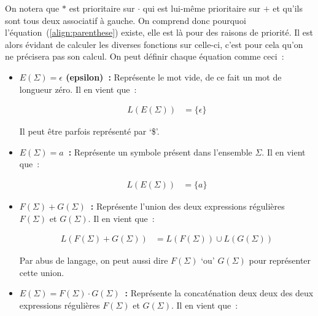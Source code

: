\documentclass[12pt]{article}
\begin{document}
On notera que \(*\) est prioritaire sur \(\cdot\) qui est lui-même prioritaire
sur \(+\) et qu'ils sont tous deux associatif à gauche. On comprend donc
pourquoi l'équation~(\ref{align:parenthese}) existe, elle est là pour des
raisons de priorité. Il est alors évidant de calculer les diverses fonctions
sur celle-ci, c'est pour cela qu'on ne précisera pas son
calcul\label{text:parenthese}. On peut définir chaque équation comme ceci~:

\vphantom{}

\begin{itemize}
    \item[\textbullet] \textbf{\(E(\Sigma) = \epsilon\) (epsilon)~:}
        Représente le mot vide, de ce fait un mot de longueur zéro. Il en vient
        que~:

        \begin{align}
            L(E(\Sigma)) & = \{\epsilon\}
        \end{align}

        Il peut être parfois représenté par `\$'.

        \vphantom{}

    \item[\textbullet] \textbf{\(E(\Sigma) = a\)~:} Représente un symbole
        présent dans l'ensemble \(\Sigma\). Il en vient que~:

        \begin{align}
            L(E(\Sigma)) & = \{a\}
        \end{align}

        \vphantom{}

    \item[\textbullet] \textbf{\(F(\Sigma) + G(\Sigma)\)~:} Représente l'union
        des deux expressions régulières \(F(\Sigma)\) et \(G(\Sigma)\). Il en
        vient que~:

        \begin{align}
            L(F(\Sigma) + G(\Sigma)) & = L(F(\Sigma)) \cup L(G(\Sigma))
        \end{align}

        Par abus de langage, on peut aussi dire \(F(\Sigma)\) `ou' \(G(\Sigma)\) pour
        représenter cette union.

        \vphantom{}

    \item[\textbullet] \textbf{\(E(\Sigma) = F(\Sigma) \cdot G(\Sigma)\)~:}
        Représente la concaténation deux deux des deux expressions régulières
        \(F(\Sigma)\) et \(G(\Sigma)\). Il en vient que~:


\end{itemize}
\end{document}
